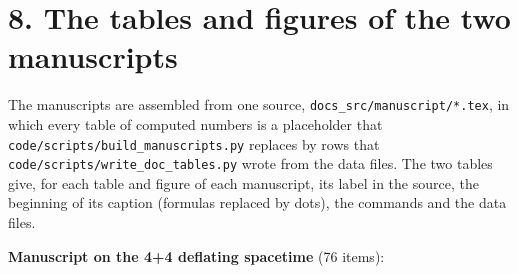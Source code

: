 \documentclass[
  10pt,
]{article}
\begin{document}
\hypertarget{the-tables-and-figures-of-the-two-manuscripts}{%
\section{8. The tables and figures of the two
manuscripts}\label{the-tables-and-figures-of-the-two-manuscripts}}

The manuscripts are assembled from one source,
\texttt{docs\_src/manuscript/*.tex}, in which every table of computed
numbers is a placeholder that
\texttt{code/scripts/build\_manuscripts.py} replaces by rows that
\texttt{code/scripts/write\_doc\_tables.py} wrote from the data files.
The two tables give, for each table and figure of each manuscript, its
label in the source, the beginning of its caption (formulas replaced by
dots), the commands and the data files.

\textbf{Manuscript on the 4+4 deflating spacetime} (76 items):
\end{document}
